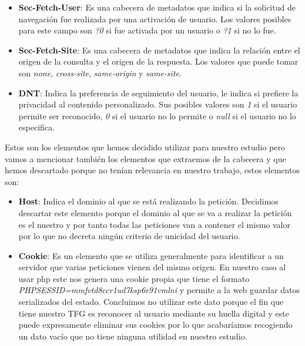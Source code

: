 \begin{itemize}
    \item \textbf{Sec-Fetch-User}: Es una cabecera de metadatos que indica si la solicitud de navegación fue realizada por una activación de usuario. Los valores posibles para este campo son \textit{?0} si fue activada por un usuario o \textit{?1} si no lo fue.
    \item \textbf{Sec-Fetch-Site}: Es una cabecera de metadatos que indica la relación entre el origen de la consulta y el origen de la respuesta. Los valores que puede tomar son \textit{none}, \textit{cross-site}, \textit{same-origin} y \textit{same-site}.
    \item \textbf{DNT}: Indica la preferencia de seguimiento del usuario, le indica si prefiere la privacidad al contenido personalizado. Sus posibles valores son \textit{1} si el usuario permite ser reconocido, \textit{0} si el usuario no lo permite o \textit{null} si el usuario no lo especifica.
\end{itemize}
Estos son los elementos que hemos decidido utilizar para nuestro estudio pero vamos a mencionar también los elementos que extraemos de la cabecera y que hemos descartado porque no tenían relevancia en nuestro trabajo, estos elementos son:
\begin{itemize}
    \item \textbf{Host}: Indica el dominio al que se está realizando la petición. Decidimos descartar este elemento porque el dominio al que se va a realizar la petición es el nuestro y por tanto todas las peticiones van a contener el mismo valor por lo que no decreta ningún criterio de unicidad del usuario.
    \item \textbf{Cookie}: Es un elemento que se utiliza generalmente para identificar a un servidor que varias peticiones vienen del mismo origen. En nuestro caso al usar php este nos genera una cookie propia que tiene el formato \textit{PHPSESSID=mmfvtd8ccr1ud7ksp6r91vmlni} y permite a la web guardar datos serializados del estado. Concluimos no utilizar este dato porque el fin que tiene nuestro TFG es reconocer al usuario mediante su huella digital y este puede expresamente eliminar sus cookies por lo que acabaríamos recogiendo un dato vacío que no tiene ninguna utilidad en nuestro estudio.
\end{itemize}

